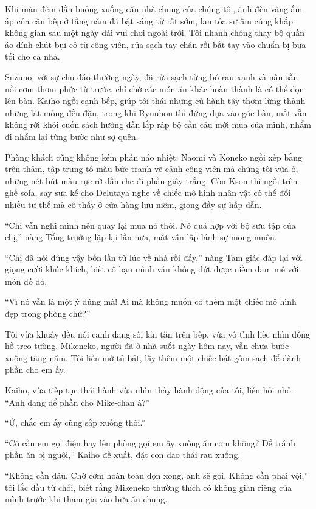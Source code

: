﻿\documentclass[../main.tex]{subfiles}
\begin{document}
Khi màn đêm dần buông xuống căn nhà chung của chúng tôi, ánh đèn vàng ấm áp của căn bếp ở tầng năm đã bật sáng từ rất sớm, lan tỏa sự ấm cúng khắp không gian sau một ngày dài vui chơi ngoài trời. Tôi nhanh chóng thay bộ quần áo dính chút bụi cỏ từ công viên, rửa sạch tay chân rồi bắt tay vào chuẩn bị bữa tối cho cả nhà.

Suzuno, với sự chu đáo thường ngày, đã rửa sạch từng bó rau xanh và nấu sẵn nồi cơm thơm phức từ trước, chỉ chờ các món ăn khác hoàn thành là có thể dọn lên bàn. Kaiho ngồi cạnh bếp, giúp tôi thái những củ hành tây thơm lừng thành những lát mỏng đều đặn, trong khi Ryuuhou thì đứng dựa vào góc bàn, mắt vẫn không rời khỏi cuốn sách hướng dẫn lắp ráp bộ cần câu mới mua của mình, nhẩm đi nhẩm lại từng bước như sợ quên.

Phòng khách cũng không kém phần náo nhiệt: Naomi và Koneko ngồi xếp bằng trên thảm, tập trung tô màu bức tranh vẽ cảnh công viên mà chúng tôi vừa ở, những nét bút màu rực rỡ dần che đi phần giấy trắng. Còn Kson thì ngồi trên ghế sofa, say sưa kể cho Delutaya nghe về chiếc mô hình nhân vật có thể đổi nhiều tư thế mà cô thấy ở cửa hàng lưu niệm, giọng đầy sự hấp dẫn.

``Chị vẫn nghĩ mình nên quay lại mua nó thôi. Nó quá hợp với bộ sưu tập của chị,'' nàng Tổng trưởng lặp lại lần nữa, mắt vẫn lấp lánh sự mong muốn.

``Chị đã nói đúng vậy bốn lần từ lúc về nhà rồi đấy,'' nàng Tam giác đáp lại với giọng cười khúc khích, biết cô bạn mình vẫn không dứt được niềm đam mê với món đồ đó.

``Vì nó vẫn là một ý đúng mà! Ai mà không muốn có thêm một chiếc mô hình đẹp trong phòng chứ?''

Tôi vừa khuấy đều nồi canh đang sôi lăn tăn trên bếp, vừa vô tình liếc nhìn đồng hồ treo tường. Mikeneko, người đã ở nhà suốt ngày hôm nay, vẫn chưa bước xuống tầng năm. Tôi liền mở tủ bát, lấy thêm một chiếc bát gốm sạch để dành phần cho em ấy.

Kaiho, vừa tiếp tục thái hành vừa nhìn thấy hành động của tôi, liền hỏi nhỏ: ``Anh đang để phần cho Mike-chan à?''

``Ừ, chắc em ấy cũng sắp xuống thôi.''

``Có cần em gọi điện hay lên phòng gọi em ấy xuống ăn cơm không? Để tránh phần ăn bị nguội,'' Kaiho đề xuất, đặt con dao thái rau xuống.

``Không cần đâu. Chờ cơm hoàn toàn dọn xong, anh sẽ gọi. Không cần phải vội,'' tôi lắc đầu từ chối, biết rằng Mikeneko thường thích có không gian riêng của mình trước khi tham gia vào bữa ăn chung.
\end{document}
